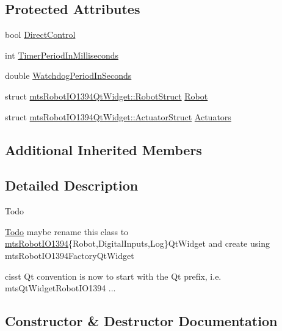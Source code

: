 \subsection*{Protected Attributes}
\begin{DoxyCompactItemize}
\item 
bool \hyperlink{classmts_robot_i_o1394_qt_widget_ae0e6af9087d5457633b4d42a93c63bcd}{Direct\+Control}
\item 
int \hyperlink{classmts_robot_i_o1394_qt_widget_a4fa3dd1b6769a8a4fc0c51b77dbf3413}{Timer\+Period\+In\+Milliseconds}
\item 
double \hyperlink{classmts_robot_i_o1394_qt_widget_a65cefe450636651de5c971d33119c6db}{Watchdog\+Period\+In\+Seconds}
\item 
struct \hyperlink{structmts_robot_i_o1394_qt_widget_1_1_robot_struct}{mts\+Robot\+I\+O1394\+Qt\+Widget\+::\+Robot\+Struct} \hyperlink{classmts_robot_i_o1394_qt_widget_ade381e042472af642876b731415a18af}{Robot}
\item 
struct \hyperlink{structmts_robot_i_o1394_qt_widget_1_1_actuator_struct}{mts\+Robot\+I\+O1394\+Qt\+Widget\+::\+Actuator\+Struct} \hyperlink{classmts_robot_i_o1394_qt_widget_a68401b5200788155540f952697487364}{Actuators}
\end{DoxyCompactItemize}
\subsection*{Additional Inherited Members}


\subsection{Detailed Description}
\begin{DoxyRefDesc}{Todo}
\item[\hyperlink{todo__todo000020}{Todo}]maybe rename this class to \hyperlink{classmts_robot_i_o1394}{mts\+Robot\+I\+O1394}\{Robot,Digital\+Inputs,Log\}Qt\+Widget and create using mts\+Robot\+I\+O1394\+Factory\+Qt\+Widget 

cisst Qt convention is now to start with the Qt prefix, i.\+e. mts\+Qt\+Widget\+Robot\+I\+O1394 ... \end{DoxyRefDesc}


\subsection{Constructor \& Destructor Documentation}
\hypertarget{classmts_robot_i_o1394_qt_widget_a543c42d3fa7318d97d89c1936d5ca743}{}
